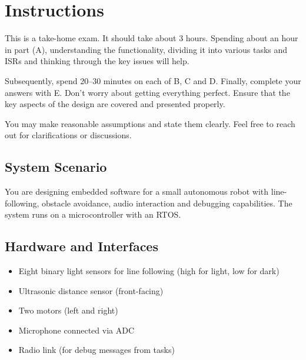 \section*{Instructions}

This is a take-home exam.
It should take about 3 hours.
Spending about an hour in part (A), understanding the functionality, dividing it into various tasks and ISRs and thinking through the key issues will help.

Subsequently, spend 20--30 minutes on each of B, C and D.
Finally, complete your answers with E.
Don’t worry about getting everything perfect.
Ensure that the key aspects of the design are covered and presented properly.

You may make reasonable assumptions and state them clearly.
Feel free to reach out for clarifications or discussions.

\vspace*{-1.5em}
\subsection*{System Scenario}
\vspace*{-0.5em}

You are designing embedded software for a small autonomous robot with line-following, obstacle avoidance, audio interaction and debugging capabilities.
The system runs on a microcontroller with an RTOS.\@

\vspace*{-1.5em}
\subsection*{Hardware and Interfaces}
\vspace*{-0.5em}

\begin{itemize}[topsep=0pt]
      \item Eight binary light sensors for line following (high for light, low for dark)

      \item Ultrasonic distance sensor (front-facing)

      \item Two motors (left and right)

      \item Microphone connected via ADC

      \item Radio link (for debug messages from tasks)
\end{itemize}

